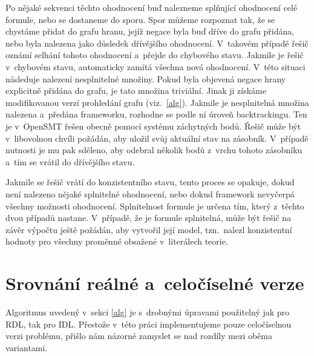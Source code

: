 Po nějaké sekvenci těchto ohodnocení buď nalezneme splňující ohodnocení celé formule, nebo se dostaneme do sporu. Spor můžeme rozpoznat tak, že se chystáme přidat do grafu hranu, jejíž negace byla buď dříve do grafu přidána, nebo byla nalezena jako důsledek dřívějšího ohodnocení. V~takovém případě řešič oznámí selhání tohoto ohodnocení a~přejde do chybového stavu. Jakmile je řešič v~chybovém stavu, automaticky zamítá všechna nová ohodnocení. V~této situaci následuje nalezení nesplnitelné množiny. Pokud byla objevená negace hrany explicitně přidána do grafu, je tato množina triviální. Jinak ji získáme modifikovanou verzí prohledání grafu (viz.~\ref{alg}). Jakmile je nesplnitelná množina nalezena a~předána frameworku, rozhodne se podle ní úroveň backtrackingu. Ten je v~OpenSMT řešen obecně pomocí systému záchytných bodů. Řešič může být v~libovolnou chvíli požádán, aby uložil svůj aktuální stav na zásobník. V~případě nutnosti je mu pak sděleno, aby odebral několik bodů z~vrchu tohoto zásobníku a~tím se vrátil do dřívějšího stavu. 

Jakmile se řešič vrátí do konzistentního stavu, tento proces se opakuje, dokud není nalezeno nějaké splnitelné ohodnocení, nebo dokud framework nevyčerpá všechny možnosti ohodnocení. Splnitelnost formule je určena tím, který z~těchto dvou případů nastane. V~případě, že je formule splnitelná, může být řešič na závěr výpočtu ještě požádán, aby vytvořil její model, tzn.~nalezl konzistentní hodnoty pro všechny proměnné obsažené v~literálech teorie.

\section{Srovnání reálné a~celočíselné verze} \label{int_v_real}

Algoritmus uvedený v~sekci \ref{alg} je s~drobnými úpravami použitelný jak pro RDL, tak pro IDL. Přestože v~této práci implementujeme pouze celočíselnou verzi problému, přišlo nám názorné zamyslet se nad rozdíly mezi oběma variantami.


